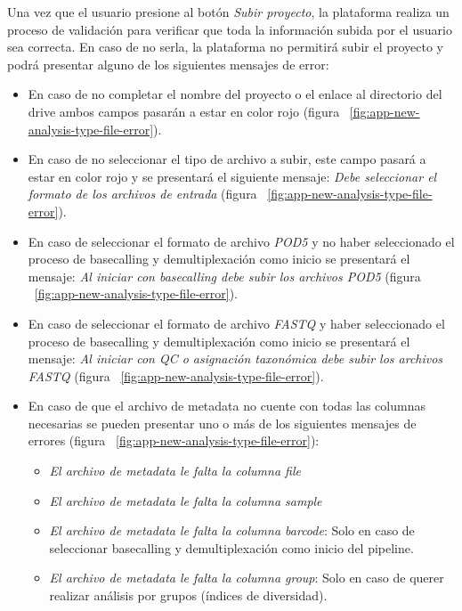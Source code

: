 

Una vez que el usuario presione al botón \textit{Subir proyecto}, la plataforma realiza un proceso de validación para verificar que toda la información subida por el usuario sea correcta. En caso de no serla, la plataforma no permitirá subir el proyecto y podrá presentar alguno de los siguientes mensajes de error:
\begin{itemize}
    \item En caso de no completar el nombre del proyecto o el enlace al directorio del drive ambos campos pasarán a estar en color rojo (figura ~\ref{fig:app-new-analysis-type-file-error}).
    \item En caso de no seleccionar el tipo de archivo a subir, este campo pasará a estar en color rojo y se presentará el siguiente mensaje: \textit{Debe seleccionar el formato de los archivos de entrada} (figura ~\ref{fig:app-new-analysis-type-file-error}).
    \item En caso de seleccionar el formato de archivo \textit{POD5} y no haber seleccionado el proceso de basecalling y demultiplexación como inicio se presentará el mensaje: \textit{Al iniciar con basecalling debe subir los archivos POD5} (figura ~\ref{fig:app-new-analysis-type-file-error}).
    \item En caso de seleccionar el formato de archivo \textit{FASTQ} y haber seleccionado el proceso de basecalling y demultiplexación como inicio se presentará el mensaje: \textit{Al iniciar con QC o asignación taxonómica debe subir los archivos FASTQ} (figura ~\ref{fig:app-new-analysis-type-file-error}).
    \item En caso de que el archivo de metadata no cuente con todas las columnas necesarias se pueden presentar uno o más de los siguientes mensajes de errores (figura ~\ref{fig:app-new-analysis-type-file-error}):
    \begin{itemize}
        \item \textit{El archivo de metadata le falta la columna file}
        \item \textit{El archivo de metadata le falta la columna sample}
        \item \textit{El archivo de metadata le falta la columna barcode}: Solo en caso de seleccionar basecalling y demultiplexación como inicio del pipeline.
        \item \textit{El archivo de metadata le falta la columna group}: Solo en caso de querer realizar análisis por grupos (índices de diversidad).

    \end{itemize}
\end{itemize}


